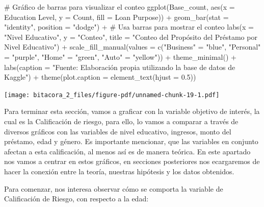 \documentclass[
  letterpaper,
  DIV=11,
  numbers=noendperiod]{scrreprt}
\newenvironment{Shaded}{\begin{snugshade}}{\end{snugshade}}
\newcommand{\AttributeTok}[1]{\textcolor[rgb]{0.40,0.45,0.13}{#1}}
\newcommand{\CommentTok}[1]{\textcolor[rgb]{0.37,0.37,0.37}{#1}}
\newcommand{\FloatTok}[1]{\textcolor[rgb]{0.68,0.00,0.00}{#1}}
\newcommand{\FunctionTok}[1]{\textcolor[rgb]{0.28,0.35,0.67}{#1}}
\newcommand{\NormalTok}[1]{\textcolor[rgb]{0.00,0.23,0.31}{#1}}
\newcommand{\OtherTok}[1]{\textcolor[rgb]{0.00,0.23,0.31}{#1}}
\newcommand{\SpecialCharTok}[1]{\textcolor[rgb]{0.37,0.37,0.37}{#1}}
\newcommand{\StringTok}[1]{\textcolor[rgb]{0.13,0.47,0.30}{#1}}
\begin{document}
\begin{Shaded}
\begin{Highlighting}[]
\CommentTok{\# Gráfico de barras para visualizar el conteo}
\FunctionTok{ggplot}\NormalTok{(Base\_count, }\FunctionTok{aes}\NormalTok{(}\AttributeTok{x =} \StringTok{\textasciigrave{}}\AttributeTok{Education Level}\StringTok{\textasciigrave{}}\NormalTok{, }\AttributeTok{y =}\NormalTok{ Count, }\AttributeTok{fill =} \StringTok{\textasciigrave{}}\AttributeTok{Loan Purpose}\StringTok{\textasciigrave{}}\NormalTok{)) }\SpecialCharTok{+}
  \FunctionTok{geom\_bar}\NormalTok{(}\AttributeTok{stat =} \StringTok{"identity"}\NormalTok{, }\AttributeTok{position =} \StringTok{"dodge"}\NormalTok{) }\SpecialCharTok{+}  \CommentTok{\# Usa barras para mostrar el conteo}
  \FunctionTok{labs}\NormalTok{(}\AttributeTok{x =} \StringTok{"Nivel Educativo"}\NormalTok{, }\AttributeTok{y =} \StringTok{"Conteo"}\NormalTok{, }\AttributeTok{title =} \StringTok{"Conteo del Propósito del Préstamo por Nivel Educativo"}\NormalTok{) }\SpecialCharTok{+}
  \FunctionTok{scale\_fill\_manual}\NormalTok{(}\AttributeTok{values =} \FunctionTok{c}\NormalTok{(}\StringTok{"Business"} \OtherTok{=} \StringTok{"blue"}\NormalTok{, }\StringTok{"Personal"} \OtherTok{=} \StringTok{"purple"}\NormalTok{, }\StringTok{"Home"} \OtherTok{=} \StringTok{"green"}\NormalTok{, }\StringTok{"Auto"} \OtherTok{=} \StringTok{"yellow"}\NormalTok{)) }\SpecialCharTok{+}
  \FunctionTok{theme\_minimal}\NormalTok{() }\SpecialCharTok{+}
  \FunctionTok{labs}\NormalTok{(}\AttributeTok{caption =} \StringTok{"Fuente: Elaboración propia utilizando la base de datos de Kaggle"}\NormalTok{) }\SpecialCharTok{+}
\FunctionTok{theme}\NormalTok{(}\AttributeTok{plot.caption =} \FunctionTok{element\_text}\NormalTok{(}\AttributeTok{hjust =} \FloatTok{0.5}\NormalTok{)) }
\end{Highlighting}
\end{Shaded}

\texttt{[image: bitacora\_2\_files/figure-pdf/unnamed-chunk-19-1.pdf]}

Para terminar esta sección, vamos a graficar con la variable objetivo de
interés, la cual es la Calificación de riesgo, para ello, lo vamos a
comparar a través de diversos gráficos con las variables de nivel
educativo, ingresos, monto del préstamo, edad y género. Es importante
mencionar, que las variables en conjunto afectan a esta calificación, al
menos así es de manera teórica. En este apartado nos vamos a centrar en
estos gráficos, en secciones posteriores nos ecargaremos de hacer la
conexión entre la teoría, nuestras hipótesis y los datos obtenidos.

Para comenzar, nos interesa observar cómo se comporta la variable de
Calificación de Riesgo, con respecto a la edad:
\end{document}
